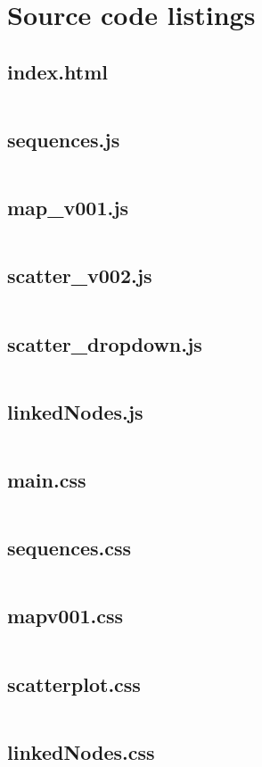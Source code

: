 \documentclass[a4paper, 11pt]{article}
\begin{document}

\newpage
\section*{Source code listings}
\subsection{index.html}
\inputminted{html}{source/index.html}

\newpage
\subsection{sequences.js}
\inputminted{js}{source/sequences.js}

\newpage
\subsection{map\_v001.js}
\inputminted{js}{source/map_v001.js}

\newpage
\subsection{scatter\_v002.js}
\inputminted{js}{source/scatter_v002.js}

\newpage
\subsection{scatter\_dropdown.js}
\inputminted{js}{source/scatter_dropdown.js}

\newpage
\subsection{linkedNodes.js}
\inputminted{js}{source/linkedNodes.js}


\newpage
\subsection{main.css}
\inputminted{css}{source/main.css}


\newpage
\subsection{sequences.css}
\inputminted{css}{source/sequences.css}


\newpage
\subsection{map\-v001.css}
\inputminted{css}{source/map-v001.css}


\newpage
\subsection{scatterplot.css}
\inputminted{css}{source/scatterplot.css}

\newpage
\subsection{linkedNodes.css}
\inputminted{css}{source/linkedNodes.css}
\end{document}
